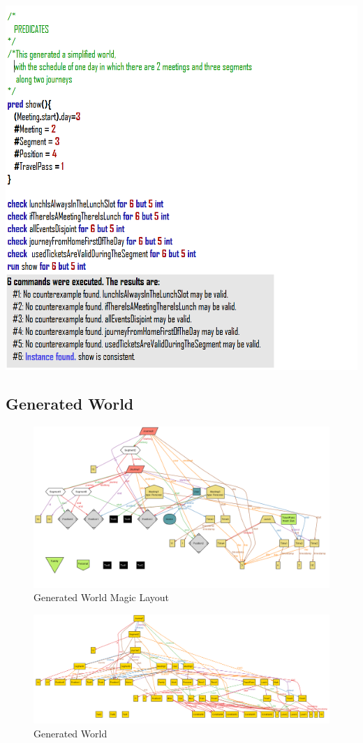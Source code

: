 \includegraphics[scale=1]{Images/alloy9}

\clearpage
\subsection{Generated World}

\begin{figure}[htb]
\centering
\includegraphics[scale=0.55]{Images/world2}
\caption{Generated World Magic Layout}
\label{fig:generatedworldmagic}
\end{figure}

\begin{figure}
\centering
\includegraphics[scale=0.65]{Images/world1}
\caption{Generated World}
\label{fig:generatedworld}
\end{figure}